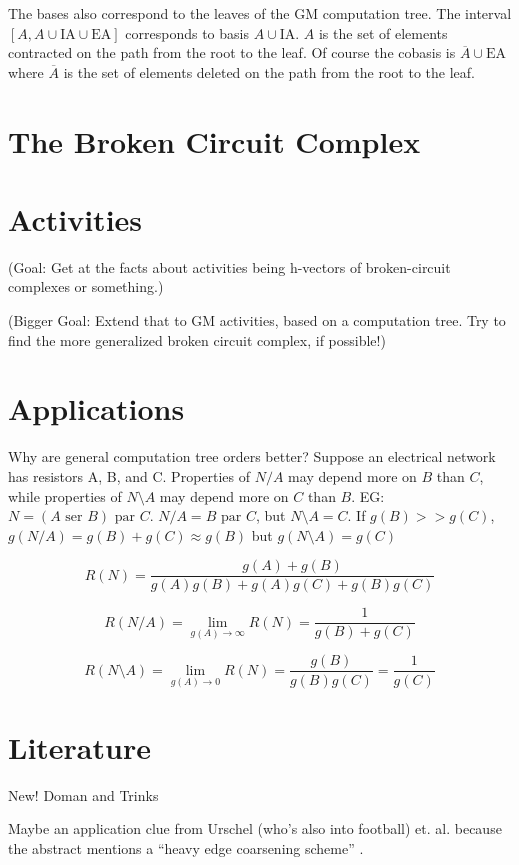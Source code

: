 \documentclass{article}
\begin{document}
\begin{enumerate}
The bases also correspond to the leaves of the GM computation tree.
The interval $[A,A\cup \text{IA}\cup\text{EA}]$ corresponds to basis
$A\cup\text{IA}$.  $A$ is the set of elements contracted on the path from the 
root to the leaf.  Of course the cobasis is $\overline{A}\cup\text{EA}$ where
$\overline{A}$ is the set of elements deleted on the path from the root to the 
leaf.



\section{The Broken Circuit Complex}

\section{Activities}

(Goal: Get at the facts about activities being h-vectors of broken-circuit complexes or 
something.)

(Bigger Goal: Extend that to GM activities, based on a computation tree.  Try to find 
the more generalized broken circuit complex, if possible!)

\section{Applications}

Why are general computation tree orders better?  Suppose an electrical network has resistors
A, B, and C.  Properties of $N/A$ may depend more on $B$ than $C$, while properties of
$N\setminus A$ may depend more on $C$ than $B$. EG: $N=(A \text{ ser } B) \text{ par } C$.
$N/A = B \text{ par } C$, but $N\setminus A = C$.  If $g(B) >> g(C)$, 
$g(N/A) = g(B) + g(C) \approx g(B)$
but $g(N\setminus A) = g(C)$ 

\[
R(N) = \frac{g(A)+g(B)}{g(A)g(B)+g(A)g(C)+g(B)g(C)}
\]

\[
R(N/A) = \lim_{g(A)\rightarrow\infty}R(N) = \frac{1}{g(B)+g(C)}
\]

\[
R(N\setminus A) = \lim_{g(A)\rightarrow 0}R(N) = \frac{g(B)}{g(B)g(C)} = \frac{1}{g(C)}
\]







\section{Literature}

New! Doman and Trinks \cite{DohmenTrinksAbsWitBrok}

Maybe an application clue from Urschel (who's also into football) et. al.
because the abstract mentions a ``heavy edge coarsening scheme''
\cite{UrschelFiedlerGraphLaplac}.

\end{enumerate}


\end{document}
